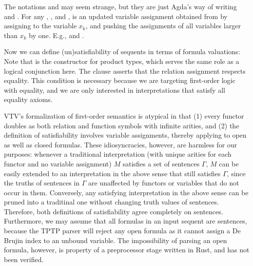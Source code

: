 \documentclass{lipics-v2021}
\begin{document}
The notations 
    and
    
may seem strange, but they are just Agda's way of writing 
   and 
  .
For any , , and , 
\AgdaSymbol{(} \AgdaFunction{/}   \AgdaSymbol{)} 
is an updated variable assignment obtained from  by assigning 
 to the variable $x_k$, and pushing the assignments of all variables 
larger than $x_k$ by one.
E.g., \AgdaSymbol{(} 
\AgdaFunction{/}   \AgdaSymbol{)}
 \AgdaSymbol{=}  
and 
\AgdaSymbol{(} 
\AgdaFunction{/}   \AgdaSymbol{)} 
\AgdaSymbol{(} \AgdaSymbol{)} \AgdaSymbol{=}  .

Now we can define (un)satisfiability of sequents in terms of formula valuations: 
Note that  is the constructor for product types, which serves 
the same role as a logical conjunction here. The \AgdaSpace{} 
clause asserts that the relation assignment  respects equality. 
This condition is necessary because we are targeting first-order logic with equality, 
and we are only interested in interpretations that satisfy all equality axioms.

VTV's formalization of first-order semantics is atypical in that (1) every functor
doubles as both relation and function symbols with infinite arities, and 
(2) the definition of satisfiability involves variable assignments, thereby applying to
open as well as closed formulas. These idiosyncracies, however, are harmless for our purposes:
whenever a traditional interpretation (with unique arities for each functor and no 
variable assignment) $M$ satisfies a set of sentences $\Gamma$, $M$ can be easily extended 
to an interpretation in the above sense that still satisfies $\Gamma$, since the 
truths of sentences in $\Gamma$ are unaffected by functors or variables that do not 
occur in them. Conversely, any satisfying interpretation in the above sense can be pruned
into a traditinal one without changing truth values of sentences. Therefore, both 
definitions of satisfiability agree completely on sentences. Furthermore, we may assume 
that all formulas in an input sequent are sentences, because the TPTP parser will reject 
any open formula as it cannot assign a De Brujin index to an unbound variable. The 
impossibility of parsing an open formula, however, is property of a preprocessor stage
written in Rust, and has not been verified. 
\end{document}
